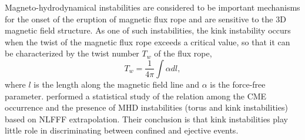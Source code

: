 \documentclass[manuscript]{aastex61}
\begin{document}
Magneto-hydrodynamical instabilities are considered to be important mechanisms for the onset of the eruption of magnetic flux rope and are sensitive to the 3D magnetic field structure. 
As one of such instabilities, the kink instability \citep{2004A&A...413L..27T} occurs when the twist of the magnetic
flux rope exceeds a critical value, so that it can be characterized by
the twist number $T_{w}$ \citep{2006JPhA...39.8321B} of the flux rope,
\begin{equation}
T_w=\frac{1}{4\pi}\int\alpha dl,
\label{eqn:twistnumber}
\end{equation}
where $l$ is the length along the magnetic field line and $\alpha$ is the force-free parameter. 
 \cite{2018ApJ...864..138J} performed a statistical study of the relation among
the CME occurrence and the presence of MHD instabilities (torus and kink instabilities) 
based on NLFFF extrapolation. Their conclusion is that kink
instabilities play little role in discriminating between confined and ejective
events.
 

\end{document}
